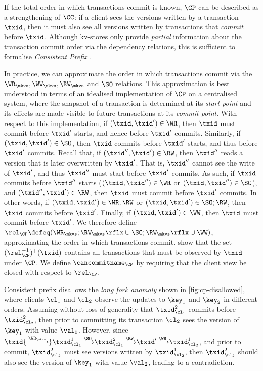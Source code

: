 \label{para:cp}
If the total order in which transactions commit is known, \(\CP\)
can be described as a strengthening of \(\CC\): 
if a client sees the versions written by a transaction \(\txid\),
then it must also see all versions written by transactions that \emph{commit} before \(\txid\). 
Although kv-stores only provide \emph{partial} information about the transaction commit order via the dependency relations,
this is sufficient to formalise \emph{Consistent Prefix} \cite{laws}.

In practice, we can approximate the order in which transactions 
commit via the \(\WR_{\mkvs}, \allowbreak \WW_{\mkvs}, \allowbreak \RW_{\mkvs}\) and \(\SO\)  relations. 
This approximation is best understood in terms of an idealised implementation of \(\CP\) on a centralised system,
where the snapshot of a transaction is determined at its \emph{start point} and its effects are made visible to future transactions at its \emph{commit point}.
With respect to this implementation, if \((\txid,\txid') \in \WR\), then 
\(\txid\) must commit before \(\txid'\) starts, and hence before \(\txid'\) commits.
Similarly, if \((\txid,\txid') \in \SO\), then \(\txid\) commits before \(\txid'\) starts, 
and thus before \(\txid'\) commits.
Recall that, if \((\txid'', \txid') \in \RW\),
then \(\txid''\) reads a version that is later overwritten by \(\txid'\).
That is, \(\txid''\) cannot see the write of \(\txid'\), and thus \(\txid''\) must start before 
\(\txid'\) commits. 
As such, if \(\txid\) commits before \(\txid''\) starts 
(\((\txid, \txid'') \in \WR\) or \((\txid,\txid'') \in \SO\)), 
and \((\txid'', \txid') \in \RW\), then \(\txid\) must commit before 
\(\txid'\) commits. 
In other words, if \((\txid,\txid') \in \WR;\RW\) or \((\txid,\txid') \in \SO;\RW\), then \(\txid\) commits before \(\txid'\).
Finally, if \((\txid,\txid') \in\WW\), then \(\txid\) must commit before \(\txid'\). 
We therefore define \(\rel_{\CP} \defeq (\WR_{\mkvs}; \RW_{\mkvs}\rflx \cup \SO;  \RW_{\mkvs}\rflx \cup \WW)\), approximating the order in which transactions commit. 
%
\citet{laws} show that the set \((\rel_{\CP}^{-1})^{+}(\txid)\) contains all transactions that must be observed by \(\txid\) under \(\CP\). 
We define \(\cancommitname_{\CP}\) by requiring that the client view be 
closed with respect to \(\rel_{\CP}\).

Consistent prefix disallows the \emph{long fork anomaly} shown in \cref{fig:cp-disallowed}, where clients \(\cl_1\) and \(\cl_2\) observe the updates to \(\key_1\) and \(\key_2\) 
in different orders. 
Assuming without loss of generality that \( \txid_{\cl_1}^{2} \) commits 
before \( \txid_{\cl_2}^{2} \), then prior to committing its transaction \(\cl_2\) sees 
the version of \(\key_1\) with value \(\val_0\). 
However, since \(\txid {\xrightarrow{\WR_{\mkvs}}} \txid_{\cl_{1}}^{1} 
{\xrightarrow{\SO}} \txid_{\cl_{1}}^{2} {\xrightarrow{\RW}} \txid' {\xrightarrow{\WR}} \txid_{\cl_{2}}^{1} \), 
and prior to commit, \( \txid_{\cl_2}^{2} \) must see versions written by \( \txid_{\cl_2}^{1} \),
then \( \txid_{\cl_2}^{2} \) should also see the version of \(\key_1\) with 
value \(\val_2\), leading to a contradiction.


